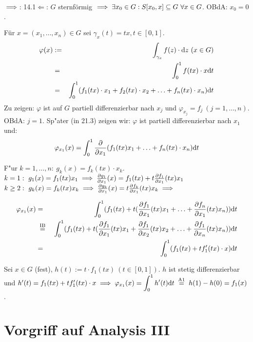 \documentclass[a4paper,twoside,DIV15,BCOR12mm,chapterprefix=true,headings=twolinechapter]{scrbook}
\begin{document}
\begin{beweis}
\glqq$\implies$\grqq: 14.1\quad \glqq$\Leftarrow$\grqq: $G$ sternförmig $\implies\exists x_0\in G:S[x_0,x]\subseteq G\ \forall x\in G$. OBdA: $x_0=0$. 

Für $x=(x_1,\ldots,x_n)\in G$ sei $\gamma_x(t)=tx, t\in [0,1]$.
\begin{eqnarray*}
\varphi(x)&:=&\int_{\gamma_x}f(z)\cdot\text{d}z\ (x\in G)\\
&=&\displaystyle\int_0^1 f(tx)\cdot x\text{d}t\\
&=&\displaystyle\int_0^1(f_1(tx)\cdot x_1+f_2(tx)\cdot x_2+\ldots+f_n(tx)\cdot x_n)\text{d}t\\
\end{eqnarray*}
Zu zeigen: $\varphi$ ist auf $G$ partiell differenzierbar nach $x_j$ und $\varphi_{x_j}=f_j\ (j=1,\ldots,n)$.
OBdA: $j=1$. Sp"ater (in 21.3) zeigen wir: $\varphi$ ist partiell differenzierbar nach $x_1$ und:
$$\varphi_{x_1}(x)=\displaystyle\int_0^1\frac{\partial}{\partial x_1}(f_1(tx)x_1+\ldots+f_n(tx)\cdot x_n)\text{d}t$$

F"ur $k=1,\ldots,n:\ g_k(x)=f_k(tx)\cdot x_k$.\\
$k=1:\ g_1(x)=f_1(tx)x_1\implies\frac{\partial g_1}{\partial x_1}(x)=f_1(tx)+t\frac{\partial f_1}{\partial x_1}(tx)x_1$\\
$k\ge 2:\ g_k(x)=f_k(tx)x_k\folgt\frac{\partial g_k}{\partial x_1}(x)=t\frac{\partial f_k}{\partial x_1}(tx)x_k\folgt$

\begin{eqnarray*}
\varphi_{x_1}(x)&=&\int_0^1(f_1(tx)+t(\frac{\partial f_1}{\partial x_1}(tx)x_1+\ldots+\frac{\partial f_n}{\partial x_1}(tx)x_n))\text{d}t\\
&\gleichnach{IB}&\int_0^1(f_1(tx)+t(\frac{\partial f_1}{\partial x_1}(tx)x_1+\frac{\partial f_1}{\partial x_2}(tx)x_2+\ldots+\frac{\partial f_1}{\partial x_n}(tx)x_n))\text{d}t\\
&=&\ds\int_0^1(f_1(tx)+tf_1'(tx)\cdot x)\text{d}t
\end{eqnarray*}

Sei $x\in G$ (fest), $h(t):=t\cdot f_1(tx)\ (t\in [0,1])$. $h$ ist stetig differenzierbar und $h'(t)=f_1(tx)+tf_1'(tx)\cdot x\folgt \varphi_{x_1}(x)=\ds\int_0^1 h'(t)\text{d}t\gleichnach{A1}h(1)-h(0)=f_1(x)$.
\end{beweis}

\chapter{Vorgriff auf Analysis III}
\end{document}
